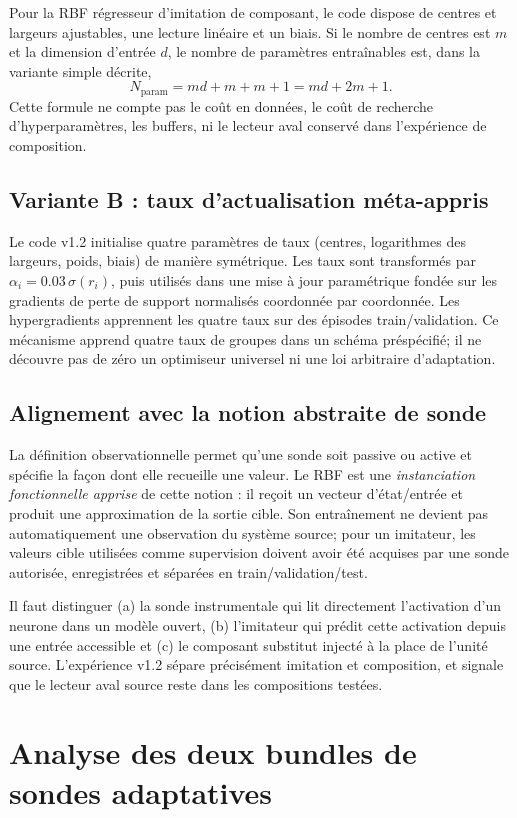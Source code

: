 \documentclass[11pt,a4paper,oneside]{report}
\begin{document}
Pour la RBF régresseur d'imitation de composant, le code dispose de centres et largeurs ajustables, une lecture linéaire et un biais. Si le nombre de centres est \(m\) et la dimension d'entrée \(d\), le nombre de paramètres entraînables est, dans la variante simple décrite,
\[
N_{\mathrm{param}}=md+m+m+1=md+2m+1.
\]
Cette formule ne compte pas le coût en données, le coût de recherche d'hyperparamètres, les buffers, ni le lecteur aval conservé dans l'expérience de composition.

\section{Variante B : taux d'actualisation méta-appris}
Le code v1.2 initialise quatre paramètres de taux (centres, logarithmes des largeurs, poids, biais) de manière symétrique. Les taux sont transformés par \(\alpha_i=0.03\,\sigma(r_i)\), puis utilisés dans une mise à jour paramétrique fondée sur les gradients de perte de support normalisés coordonnée par coordonnée. Les hypergradients apprennent les quatre taux sur des épisodes train/validation. Ce mécanisme apprend quatre taux de groupes dans un schéma préspécifié; il ne découvre pas de zéro un optimiseur universel ni une loi arbitraire d'adaptation.

\section{Alignement avec la notion abstraite de sonde}
La définition observationnelle permet qu'une sonde soit passive ou active et spécifie la façon dont elle recueille une valeur. Le RBF est une \emph{instanciation fonctionnelle apprise} de cette notion : il reçoit un vecteur d'état/entrée et produit une approximation de la sortie cible. Son entraînement ne devient pas automatiquement une observation du système source; pour un imitateur, les valeurs cible utilisées comme supervision doivent avoir été acquises par une sonde autorisée, enregistrées et séparées en train/validation/test.

Il faut distinguer (a) la sonde instrumentale qui lit directement l'activation d'un neurone dans un modèle ouvert, (b) l'imitateur qui prédit cette activation depuis une entrée accessible et (c) le composant substitut injecté à la place de l'unité source. L'expérience v1.2 sépare précisément imitation et composition, et signale que le lecteur aval source reste dans les compositions testées.

\chapter{Analyse des deux bundles de sondes adaptatives}
\end{document}
